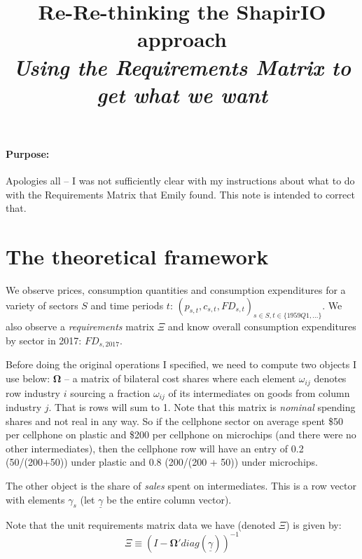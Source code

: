 \documentclass[12pt,english]{article}
\begin{document}


\title{Re-Re-thinking the ShapirIO approach\\ \emph{Using the Requirements Matrix to get what we want}}
\maketitle

\paragraph{Purpose:} Apologies all -- I was not sufficiently clear with my instructions about what to do with the Requirements Matrix that Emily found. This note is intended to correct that.

\section*{The theoretical framework}

We observe prices, consumption quantities and consumption expenditures for a variety of sectors $S$ and time periods $t$: $(p_{s,t},c_{s,t},FD_{s,t})_{s\in S,t\in \{1959Q1,...\}}$. We also observe a \emph{requirements} matrix $\Xi$ and know overall consumption expenditures by sector in 2017: $FD_{s,2017}$.

Before doing the original operations I specified, we need to compute two objects I use below: $\mathbold{\Omega}$ -- a matrix of bilateral cost shares where each element $\omega_{ij}$ denotes row industry $i$ sourcing a fraction $\omega_{ij}$ of its intermediates on goods from column industry $j$. That is rows will sum to 1. Note that this matrix is \emph{nominal} spending shares and not real in any way. So if the cellphone sector on average spent \$50 per cellphone on plastic and \$200 per cellphone on microchips (and there were no other intermediates), then the cellphone row will have an entry of 0.2 (50/(200+50)) under plastic and 0.8 (200/(200 + 50)) under microchips.

The other object is the share of \emph{sales} spent on intermediates. This is a row vector with elements $\gamma_s$ (let $\underline{\gamma}$ be the entire column vector). 

Note that the unit requirements matrix data we have (denoted $\Xi$) is given by:
$$
	\Xi \equiv (I - \mathbold{\Omega}'diag(\underline{\gamma}))^{-1}
$$
\end{document}
